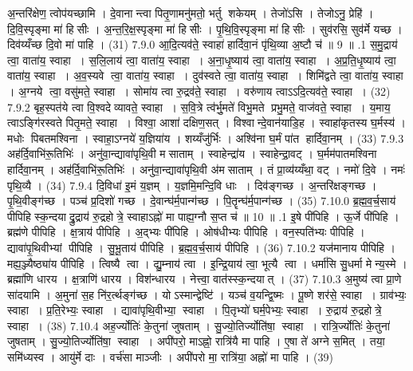 अ॒न्तरि॑क्षेण॒ त्वोप॑यच्छामि । दे॒वानान्त्वा पितृ॒णामनु॑मतो॒ भर्तु शकेयम् । तेजो॑ऽसि । तेजोऽनु॒ प्रेहि॑ । दि॒वि॒स्पृङ्मा मा॑ हिसीः । अ॒न्त॒रि॒क्ष॒स्पृङ्मा मा॑ हिसीः । पृ॒थि॒वि॒स्पृङ्मा मा॑ हिसीः । सुव॑रसि॒ सुव॑र्मे यच्छ । दिव॑य्यँच्छ दि॒वो मा॑ पाहि । (31)
7.9.0
आ॒दि॒त्यव॑ते॒ स्वाहा॑ हार्दिवा॒नं पृ॑थि॒व्या अ॒ष्टौ च॑ ॥ 9 ॥
.1
स॒मु॒द्राय॑ त्वा॒ वाता॑य॒ स्वाहा । स॒लि॒लाय॑ त्वा॒ वाता॑य॒ स्वाहा । अ॒ना॒धृ॒ष्याय॑ त्वा॒ वाता॑य॒ स्वाहा । अ॒प्र॒ति॒धृ॒ष्याय॑ त्वा॒ वाता॑य॒ स्वाहा । अ॒व॒स्यवे त्वा॒ वाता॑य॒ स्वाहा । दुव॑स्वते त्वा॒ वाता॑य॒ स्वाहा । शिमि॑द्वते त्वा॒ वाता॑य॒ स्वाहा । अ॒ग्नये त्वा॒ वसु॑मते॒ स्वाहा । सोमा॑य त्वा रु॒द्रव॑ते॒ स्वाहा । वरु॑णाय त्वाऽऽदि॒त्यव॑ते॒ स्वाहा । (32)
7.9.2
बृह॒स्पत॑ये त्वा वि॒श्वदेव्यावते॒ स्वाहा । स॒वि॒त्रे त्व॑र्भु॒मते॑ विभु॒मते प्रभु॒मते॒ वाज॑वते॒ स्वाहा । य॒माय॒ त्वाऽङ्गि॑रस्वते पितृ॒मते॒ स्वाहा । विश्वा॒ आशा॑ दक्षिण॒सत् । विश्वान्दे॒वान॑याडि॒ह । स्वाहा॑कृतस्य घ॒र्मस्य॑ । मधोः पिबतमश्विना । स्वाहा॒ऽग्नये॑ य॒ज्ञिया॑य । शय्यँजु॑र्भिः । अश्वि॑ना घ॒र्मं पा॑त हार्दिवा॒नम् । (33)
7.9.3
अह॑र्दि॒वाभि॑रू॒तिभिः॑ । अनु॑वा॒न्द्यावा॑पृथि॒वी मसाताम् । स्वाहेन्द्रा॑य । स्वाहेन्द्रा॒वट् । घ॒र्मम॑पातमश्विना हार्दिवा॒नम् । अह॑र्दि॒वाभि॑रू॒तिभिः॑ । अनु॑वा॒न्द्यावा॑पृथि॒वी अ॑मसाताम् । तं प्रा॒व्य॑य्यँथा॒ वट् । नमो॑ दि॒वे । नमः॑ पृथि॒व्यै । (34)
7.9.4
दि॒विधा॑ इ॒मं य॒ज्ञम् । य॒ज्ञमि॒मन्दि॒वि धाः । दिव॑ङ्गच्छ । अ॒न्तरि॑क्षङ्गच्छ । पृ॒थि॒वीङ्ग॑च्छ । पञ्च॑ प्र॒दिशो॑ गच्छ । दे॒वान्घ॑र्म॒पान्ग॑च्छ । पि॒तॄन्घ॑र्म॒पान्ग॑च्छ । (35)
7.10.0
ब्र॒ह्म॒व॒र्च॒साय॑ पीपिहि स्क॒न्दयाद्रु॒द्राय॑ रु॒द्रहोत्रे॒ स्वाहाऽह्नो॑ मा पाह्य॒ग्नौ स॒प्त च॑ ॥ 10 ॥
.1
इ॒षे पी॑पिहि । ऊ॒र्जे पी॑पिहि । ब्रह्म॑णे पीपिहि । क्ष॒त्राय॑ पीपिहि । अ॒द्भ्यः पी॑पिहि । ओष॑धीभ्यः पीपिहि । वन॒स्पति॑भ्यः पीपिहि । द्यावा॑पृ॒थिवीभ्यां पीपिहि । सु॒भू॒ताय॑ पीपिहि । ब्र॒ह्म॒व॒र्च॒साय॑ पीपिहि । (36)
7.10.2
यज॑मानाय पीपिहि । मह्य॒ञ्ज्यैष्ठ्या॑य पीपिहि । त्विष्यै त्वा । द्यु॒म्नाय॑ त्वा । इ॒न्द्रि॒याय॑ त्वा॒ भूत्यै त्वा । धर्मा॑सि सु॒धर्मा मेन्य॒स्मे । ब्रह्मा॑णि धारय । क्ष॒त्राणि॑ धारय । विश॑न्धारय । नेत्त्वा॒ वात॑स्स्क॒न्दयात् । (37)
7.10.3
अ॒मुष्य॑ त्वा प्रा॒णे सा॑दयामि । अ॒मुना॑ स॒ह नि॑र॒र्त्थङ्ग॑च्छ । योऽस्मान्द्वेष्टि॑ । यञ्च॑ व॒यन्द्वि॒ष्मः । पू॒ष्णे शर॑से॒ स्वाहा । ग्राव॑भ्यः॒ स्वाहा । प्र॒ति॒रेभ्यः॒ स्वाहा । द्यावा॑पृथि॒वीभ्या॒ स्वाहा । पि॒तृभ्यो॑ घर्म॒पेभ्यः॒ स्वाहा । रु॒द्राय॑ रु॒द्रहोत्रे॒ स्वाहा । (38)
7.10.4
अह॒र्ज्योतिः॑ के॒तुना॑ जुषताम् । सु॒ज्यो॒तिर्ज्योति॑षा॒ स्वाहा । रात्रि॒र्ज्योतिः॑ के॒तुना॑ जुषताम् । सु॒ज्यो॒तिर्ज्योति॑षा॒ स्वाहा । अपी॑परो॒ माऽह्नो॒ रात्रि॑यै मा पाहि । ए॒षा ते॑ अग्ने स॒मित् । तया॒ समि॑ध्यस्व । आयु॑र्मे दाः । वर्च॑सा माञ्जीः । अपी॑परो मा॒ रात्रि॑या॒ अह्नो॑ मा पाहि । (39)
